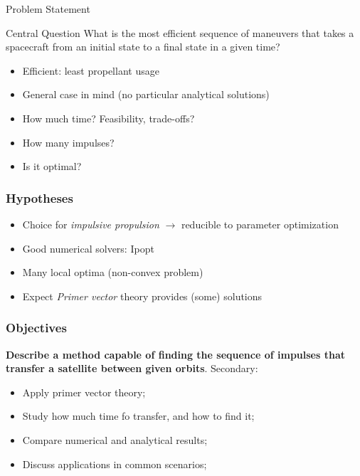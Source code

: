 \documentclass{beamer}
\begin{document}
\begin{frame}{Problem Statement}
    \pause
    \begin{block}{Central Question}
        What is the most efficient sequence of maneuvers that takes a spacecraft from an initial state to a final state in a given time?
    \end{block}
    
    \begin{itemize}
        \pause
        \item Efficient: least propellant usage
        \item General case in mind (no particular analytical solutions) 
        \item How much time? Feasibility, trade-offs?
        \item How many impulses?
        \item Is it optimal?
    \end{itemize}
\end{frame}

\begin{frame}
    \frametitle{Hypotheses}

    \begin{itemize}
        \item Choice for \textit{impulsive propulsion} \(\rightarrow\) reducible to parameter optimization
        \item Good numerical solvers: Ipopt\cite{ipopt}
        \item Many local optima (non-convex problem) \pause
        \item Expect \textit{Primer vector} theory provides (some) solutions
    \end{itemize}
\end{frame}

\begin{frame}
    \frametitle{Objectives}
    \textbf{Describe a method capable of finding the sequence
    of impulses that transfer a satellite between given orbits}. Secondary:
    \pause
    \begin{itemize}
        \item Apply primer vector theory;
        \item Study how much time fo transfer, and how to find it;
        \item Compare numerical and analytical results;
        \item Discuss applications in common scenarios;
    \end{itemize}

\end{frame}
\end{document}
